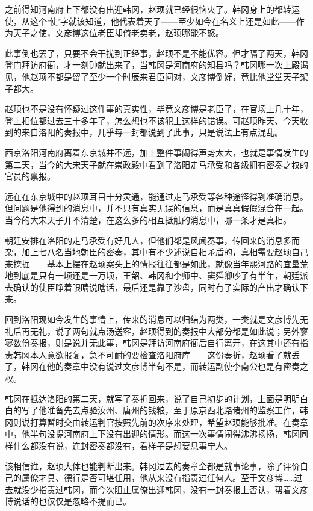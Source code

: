 之前得知河南府上下都没有出迎韩冈，赵顼就已经很恼火了。韩冈身上的都转运使，从这个‘使’字就该知道，他代表着天子——至少如今在名义上还是如此——作为天子之使，文彦博这位老臣却倚老卖老，赵顼哪能不怒。

此事倒也罢了，只要不会干扰到正经事，赵顼不是不能优容。但才隔了两天，韩冈登门拜访府衙，才一刻钟就出来了，当韩冈是河南府的知县吗？韩冈哪一次上殿谒见，他赵顼不都是留了至少一个时辰来君臣问对，文彦博倒好，竟比他堂堂天子架子都大。

赵顼也不是没有怀疑过这件事的真实性，毕竟文彦博是老臣了，在官场上几十年，登上相位都过去三十多年了，怎么想也不该犯上这样的错误。可赵顼昨天、今天收到的来自洛阳的奏报中，几乎每一封都说到了此事，只是说法上有点混乱。

西京洛阳河南府离着东京城并不远，加上整件事闹得声势太大，也就是事情发生的第二天，当今的大宋天子就在崇政殿中看到了洛阳走马承受和各级拥有密奏之权的官员的禀报。

远在在东京城中的赵顼耳目十分灵通，能通过走马承受等各种途径得到准确消息。但问题是他得到的消息中，并不只有真实无误的信息，而是真真假假混合在一起。当今的大宋天子并不清楚，在这么多的相互抵触的消息中，哪一条才是真相。

朝廷安排在洛阳的走马承受有好几人，但他们都是风闻奏事，传回来的消息多而杂，加上七八名当地朝臣的密奏，其中有不少述说自相矛盾的，真相需要赵顼自己来挖掘——基本上摆在赵顼案头上的情报往往都是如此，就像当年熙河路的宜垦荒地到底是只有一顷还是一万顷，王韶、韩冈和李师中、窦舜卿吵了有半年，朝廷派去确认的使臣睁着眼睛说瞎话，最后还是靠了沙盘，同时有了实际的产出才确认下来。

回到洛阳现如今发生的事情上，传来的消息可以归结为两类，一类就是文彦博先无礼后再无礼，说了两句就点汤送客，赵顼得到的奏报中大部分都是如此说；另外寥寥数份奏报，则是说并无此事，韩冈是拜访河南府衙后自行离开，在这其中还有指责韩冈本人意欲报复，急不可耐的要检查洛阳府库——这份奏折，赵顼看了就丢了，韩冈在他的奏章中没有说过文彦博半句不是，而转运副使李南公也是有密奏之权。

韩冈在抵达洛阳的第二天，就写了奏折回来，说了自己初步的计划，上面是明明白白的写了他准备先去点验汝州、唐州的钱粮，至于原京西北路诸州的监察工作，韩冈则说打算暂时交由转运判官按照先前的次序来处理，希望赵顼能够批准。在奏章中，他半句没提河南府上下没有出迎的情形。而这一次事情闹得沸沸扬扬，韩冈同样什么都没有说，连封密奏都没有，看样子是想要息事宁人。

该相信谁，赵顼大体也能判断出来。韩冈过去的奏章全都是就事论事，除了评价自己的属僚才具、德行是否可堪任用，他从来没有指责过任何人。至于文彦博……过去就没少指责过韩冈，而今次阻止属僚出迎韩冈，没有一封奏报上否认，帮着文彦博说话的也仅仅是忽略不提而已。

